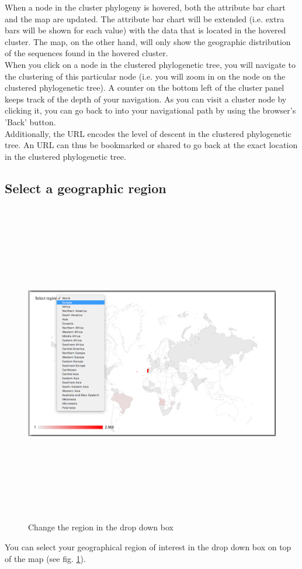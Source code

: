 \documentclass[a4paper, 11pt]{article} %
\begin{document}
When a node in the cluster phylogeny is hovered, both the attribute bar chart and the map are updated. The attribute bar chart will be extended (i.e. extra bars will be shown for each value) with the data that is located in the hovered cluster. The map, on the other hand, will only show the geographic distribution of the sequences found in the hovered cluster.
\\
When you click on a node in the clustered phylogenetic tree, you will navigate to the clustering of this particular node (i.e. you will zoom in on the node on the clustered phylogenetic tree).
A counter on the bottom left of the cluster panel keeps track of the depth of your navigation. As you can visit a cluster node by clicking it, you can go back to into your navigational path by using the browser's 'Back' button.
\\
Additionally, the URL encodes the level of descent in the clustered phylogenetic tree. An URL can thus be bookmarked or shared to go back at the exact location in the clustered phylogenetic tree.\\ 

\subsection{Select a geographic region}
\begin{figure}[H]
\centering
\includegraphics[width=400pt, height=400pt, keepaspectratio=true]{images/change_country.PNG}
\caption{Change the region in the drop down box}
\label{fig:change_region}
\end{figure}
You can select your geographical region of interest in the drop down box on top of the map (see fig. \ref{fig:change_region}). 
\end{document}
